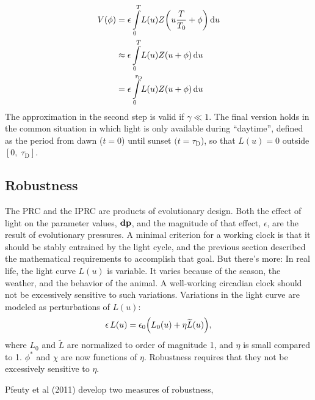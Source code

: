 \documentclass[10pt,letter, swedish, english,%
]{article}
\begin{document}
\begin{equation}\label{eq:convolution}
\begin{aligned}
V(\phi)&=\epsilon \int_{0}^{T}\! 
L(u)Z\qty(u\frac{T}{{T}_{0}}+\phi) \id{u}
\\
&\approx\epsilon \int_{0}^{T}\!
L(u)Z(u+\phi)\id{u}
\\
&=\epsilon \int _{0}^{\tau_\text{D}}\!
L(u)Z(u+\phi)\id{u}
\end{aligned}
\end{equation}
The approximation in the second step is valid if  $\gamma\ll1$. The
final version holds in the common situation in which light is only
available during ``daytime'', defined as the period from dawn ($t=0$)
until sunset  $(t=\tau_\text{D}$), so that  $L(u)=0$ outside
 $[0,\;\tau_\text{D}]$. 





\subsection{Robustness}
The PRC and the IPRC are products of evolutionary design. Both the
effect of light on the parameter values,  $\vb{dp}$, and the
magnitude of that effect,  $\epsilon $, are the result of
evolutionary pressures. A minimal criterion for a working clock is
that it should be stably entrained by the light cycle, and the
previous section described the mathematical requirements to
accomplish that goal. But there's more: In real life, the light curve
 $L(u)$ is variable. It varies because of the season, the weather,
and the behavior of the animal. A well-working circadian clock should
not be excessively sensitive to such variations. Variations in the
light curve are modeled as perturbations of  $L(u)$:
\begin{equation}
\epsilon\,L(u)
=\epsilon_{0}\qty({L}_{0}(u)+\eta \widetilde{{L}}(u)),
\end{equation}
where ${L}_{0}$ and  $\widetilde{{L}}$ are normalized to order of magnitude
1, and  $\eta$ is small compared to 1. $\phi^{*}$ and $\chi$ are now
functions of $\eta$. Robustness requires that they not be excessively
sensitive to  $\eta$.

Pfeuty et al (2011) develop two measures of robustness,
\end{document}
